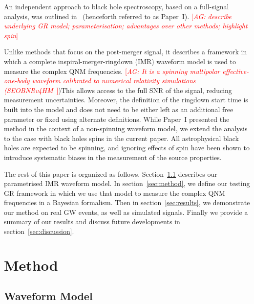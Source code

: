 \documentclass[twocolumn,prd,superscriptaddress,amsfonts,amssymb,amsmath,preprintnumbers]{revtex4-1}
\newcommand{\paperone}{Paper~I\xspace}
\newcommand{\abhi}[1]{\textcolor{red}{[\textit{AG: #1}]}}
\begin{document}
\par
An independent approach to black hole spectroscopy, based on a full-signal analysis, was outlined in~\citep{Brito:2018rfr} (henceforth referred to as \paperone). \abhi{describe underlying GR model; parameterisation; advantages over other methods; highlight spin} 



Unlike methods that focus on the post-merger signal, it describes a framework in which a complete inspiral-merger-ringdown (IMR) waveform model is used to measure the complex QNM frequencies. \abhi{It is a spinning multipolar effective-one-body waveform calibrated to numerical relativity simulations (SEOBNRv4HM~\citep{Cotesta:2018fcv}})This allows access to the full SNR of the signal, reducing measurement uncertainties. Moreover, the definition of the ringdown start time is built into the model and does not need to be either left as an additional free parameter or fixed using alternate definitions. While \paperone presented the method in the context of a non-spinning waveform model, we extend the analysis to the case with black holes spins in the current paper. All astrophysical black holes are expected to be spinning, and ignoring effects of spin have been shown to introduce systematic biases in the measurement of the source properties.
\par
The rest of this paper is organized as follows. Section~\ref{sec:model} describes our parametrised IMR waveform model. In section~\ref{sec:method}, we define our testing GR framework in which we use that model to measure the complex QNM frequencies in a Bayesian formalism. Then in section~\ref{sec:results}, we demonstrate our method on real GW events, as well as simulated signals. Finally we provide a summary of our results and discuss future developments in section~\ref{sec:discussion}.

\section{Method}
\subsection{Waveform Model}\label{sec:model}


\end{document}
